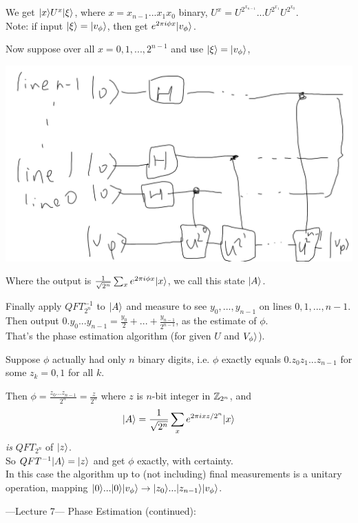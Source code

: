 \documentclass[a4paper]{article}
\begin{document}
We get $|x\rangle U^x |\xi\rangle$, where $x=x_{n-1}...x_1x_0$ binary, $U^x = U^{2^{x_{n-1}}} ... U^{2^{x_1}}U^{2^{x_0}}$.\\
Note: if input $|\xi\rangle = |v_\phi\rangle$, then get $e^{2\pi i \phi x}|v_\phi\rangle$.

Now suppose over all $x=0,1,...,2^{n-1}$ and use $|\xi\rangle = |v_\phi\rangle$,

\includegraphics[scale=0.5]{image/QC_03.png}

Where the output is $\frac{1}{\sqrt{2^n}} \sum_x e^{2\pi i\phi x} |x\rangle$, we call this state $|A\rangle$.

Finally apply $QFT_{2^n}^{-1}$ to $|A\rangle$ and measure to see $y_0,...,y_{n-1}$ on lines $0,1,...,n-1$. Then output $0.y_0...y_{n-1} = \frac{y_0}{2}+...+\frac{y_{n-1}}{2^{n-1}}$, as the estimate of $\phi$.\\
That's the phase estimation algorithm (for given $U$ and $V_\phi\rangle$).

Suppose $\phi$ actually had only $n$ binary digits, i.e. $\phi$ exactly equals $0.z_0z_1...z_{n-1}$ for some $z_k=0,1$ for all $k$.

Then $\phi = \frac{z_0...z_{n-1}}{2^n} = \frac{z}{2^n}$ where $z$ is $n$-bit integer in $\mathbb{Z}_{2^n}$, and
$$ |A\rangle = \frac{1}{\sqrt{2^n}} \sum_x e^{2\pi ixz/2^n} |x\rangle$$
\emph{is} $QFT_{2^n}$ of $|z\rangle$.\\
So $QFT^{-1} |A\rangle = |z\rangle$ and get $\phi$ exactly, with certainty.\\
In this case the algorithm up to (not including) final measurements is a unitary operation, mapping $|0\rangle ... |0\rangle |v_\phi \rangle \to |z_0 \rangle ... |z_{n-1} \rangle |v_\phi\rangle$.

---Lecture 7---
Phase Estimation (continued):\\
\end{document}
